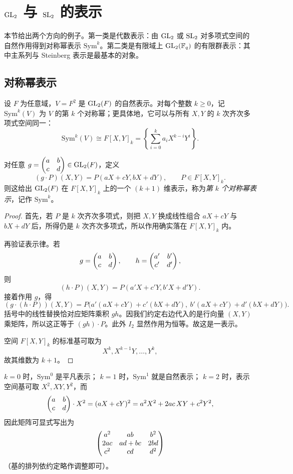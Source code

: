 \section{$\mathrm{GL}_2$ 与 $\mathrm{SL}_2$ 的表示}

本节给出两个方向的例子。第一类是代数表示：由 $\mathrm{GL}_2$ 或 $\mathrm{SL}_2$ 对多项式空间的自然作用得到对称幂表示 $\mathrm{Sym}^k$。第二类是有限域上 $\mathrm{GL}_2(\mathbb{F}_q)$ 的有限群表示：其中主系列与 Steinberg 表示是最基本的对象。

\subsection*{对称幂表示}

设 $F$ 为任意域，$V=F^2$ 是 $\mathrm{GL}_2(F)$ 的自然表示。对每个整数 $k\ge 0$，记 $\mathrm{Sym}^k(V)$ 为 $V$ 的第 $k$ 个对称幂；更具体地，它可以与所有 $X,Y$ 的 $k$ 次齐次多项式空间同一：
\[
\mathrm{Sym}^k(V)\cong F[X,Y]_k=
\left\{\sum_{i=0}^k a_iX^{k-i}Y^i\right\}.
\]

\begin{proposition}
对任意 $g=\begin{pmatrix} a&b\\c&d \end{pmatrix}\in \mathrm{GL}_2(F)$，定义
\[
(g\cdot P)(X,Y)=P(aX+cY,bX+dY),\qquad P\in F[X,Y]_k.
\]
则这给出 $\mathrm{GL}_2(F)$ 在 $F[X,Y]_k$ 上的一个 $(k+1)$ 维表示，称为\emph{第 $k$ 个对称幂表示}，记作 $\mathrm{Sym}^k$。
\end{proposition}

\begin{proof}
首先，若 $P$ 是 $k$ 次齐次多项式，则把 $X,Y$ 换成线性组合 $aX+cY$ 与 $bX+dY$ 后，所得仍是 $k$ 次齐次多项式，所以作用确实落在 $F[X,Y]_k$ 内。

再验证表示律。若
\[
g=\begin{pmatrix} a&b\\c&d \end{pmatrix},\qquad h=\begin{pmatrix} a'&b'\\c'&d' \end{pmatrix},
\]
则
\[
(h\cdot P)(X,Y)=P(a'X+c'Y,b'X+d'Y).
\]
接着作用 $g$，得
\[
(g\cdot (h\cdot P))(X,Y)
=P\bigl(a'(aX+cY)+c'(bX+dY),\ b'(aX+cY)+d'(bX+dY)\bigr).
\]
括号中的线性替换恰对应矩阵乘积 $gh$。因我们约定右边代入的是行向量 $(X,Y)$ 乘矩阵，所以这正等于 $(gh)\cdot P$。此外 $I_2$ 显然作用为恒等。故这是一表示。

空间 $F[X,Y]_k$ 的标准基可取为
\[
X^k,X^{k-1}Y,\dots,Y^k,
\]
故其维数为 $k+1$。
\end{proof}

\begin{example}
$k=0$ 时，$\mathrm{Sym}^0$ 是平凡表示；
$k=1$ 时，$\mathrm{Sym}^1$ 就是自然表示；
$k=2$ 时，表示空间基可取 $X^2,XY,Y^2$，而
\[
\begin{pmatrix} a&b\\c&d \end{pmatrix}\cdot X^2=(aX+cY)^2=a^2X^2+2ac\,XY+c^2Y^2,
\]
因此矩阵可显式写出为
\[
\begin{pmatrix} a^2&ab&b^2\\2ac&ad+bc&2bd\\c^2&cd&d^2 \end{pmatrix}
\]
（基的排列依约定略作调整即可）。
\end{example}

